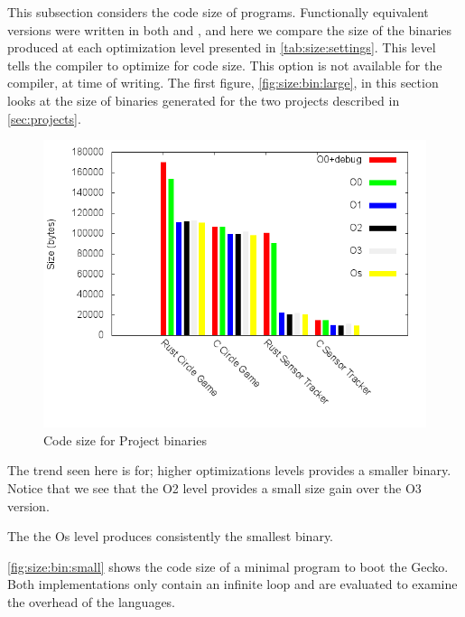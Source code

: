 This subsection considers the code size of programs.
Functionally equivalent versions were written in both {\rust} and {\C}, and here we compare the size of the binaries produced at each optimization level presented in \autoref{tab:size:settings}.
This level tells the compiler to optimize for code size.
This option is not available for the {\rust} compiler, at time of writing.
The first figure, \autoref{fig:size:bin:large}, in this section looks at the size of binaries generated for the two projects described in \autoref{sec:projects}.

\begin{figure}[H]
  \begin{center}
    \includegraphics[scale=0.5]{results/plots/size/bin/large/size.png}
  \end{center}
  \caption{Code size for Project binaries}
  \label{fig:size:bin:large}
\end{figure}

The trend seen here is for; higher optimizations levels provides a smaller binary.
Notice that we see that the O2 level provides a small size gain over the O3 version.

The the Os {\C} level produces consistently the smallest binary.

\autoref{fig:size:bin:small} shows the code size of a minimal program to boot the Gecko.
Both implementations only contain an infinite loop and are evaluated to examine the overhead of the languages.

